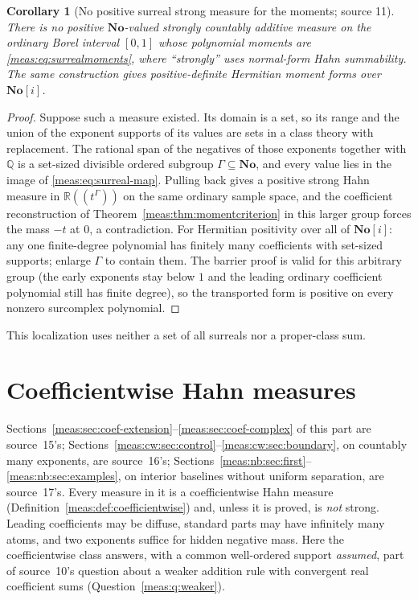 \documentclass[11pt]{article}
\numberwithin{equation}{section}
\newtheorem{corollary}[theorem]{Corollary}
\theoremstyle{definition}
\theoremstyle{remark}
\newcommand{\R}{\mathbb R}
\newcommand{\Q}{\mathbb Q}
\newcommand{\No}{\mathbf{No}}
\begin{document}
\begin{corollary}[No positive surreal strong measure for the moments;
source 11]\label{meas:cor:actualNo}
There is no positive $\No$-valued strongly countably additive measure on the
ordinary Borel interval $[0,1]$ whose polynomial moments are
\eqref{meas:eq:surrealmoments}, where ``strongly'' uses normal-form Hahn
summability. The same construction gives positive-definite Hermitian moment
forms over $\No[i]$.
\end{corollary}
\begin{proof}
Suppose such a measure existed. Its domain is a set, so its range and the union
of the exponent supports of its values are sets in a class theory with
replacement. The rational span of the negatives of those exponents together
with $\Q$ is a set-sized divisible ordered subgroup $\Gamma\subseteq\No$, and
every value lies in the image of \eqref{meas:eq:surreal-map}. Pulling back gives a
positive strong Hahn measure in $\R((t^\Gamma))$ on the same ordinary sample
space, and the coefficient reconstruction of
Theorem~\ref{meas:thm:momentcriterion} in this larger group forces the mass $-t$
at $0$, a contradiction. For Hermitian positivity over all of $\No[i]$: any one
finite-degree polynomial has finitely many coefficients with set-sized
supports; enlarge $\Gamma$ to contain them. The barrier proof is valid for this
arbitrary group (the early exponents stay below $1$ and the leading ordinary
coefficient polynomial still has finite degree), so the transported form is
positive on every nonzero surcomplex polynomial.
\end{proof}

This localization uses neither a set of all surreals nor a proper-class sum.

\part{Coefficientwise Hahn measures}\label{meas:part:coef}

Sections~\ref{meas:sec:coef-extension}--\ref{meas:sec:coef-complex} of this part
are source~15's; Sections~\ref{meas:cw:sec:control}--\ref{meas:cw:sec:boundary},
on countably many exponents, are source~16's;
Sections~\ref{meas:nb:sec:first}--\ref{meas:nb:sec:examples}, on interior baselines
without uniform separation, are source~17's. Every measure in it is a coefficientwise Hahn measure
(Definition~\ref{meas:def:coefficientwise}) and, unless it is proved, is
\emph{not} strong. Leading coefficients may be diffuse, standard parts may have
infinitely many atoms, and two exponents suffice for hidden negative mass. Here
the coefficientwise class answers, with a common well-ordered support
\emph{assumed}, part of source~10's question about a weaker addition rule with
convergent real coefficient sums (Question~\ref{meas:q:weaker}).
\end{document}
